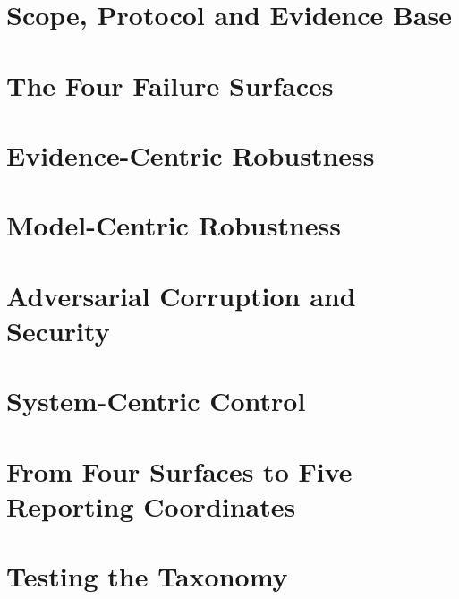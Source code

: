 \documentclass[11pt]{article}
\begin{document}
\section{Scope, Protocol and Evidence Base}
\label{sec:protocol}





\section{The Four Failure Surfaces}
\label{sec:taxonomy}



\section{Evidence-Centric Robustness}
\label{sec:evidence}



\section{Model-Centric Robustness}
\label{sec:model}



\section{Adversarial Corruption and Security}
\label{sec:adversarial}



\section{System-Centric Control}
\label{sec:system}



\section{From Four Surfaces to Five Reporting Coordinates}
\label{sec:coordinates}
\label{sec:estimands}



\section{Testing the Taxonomy}
\label{sec:tested}
\label{sec:instrument}
\end{document}
